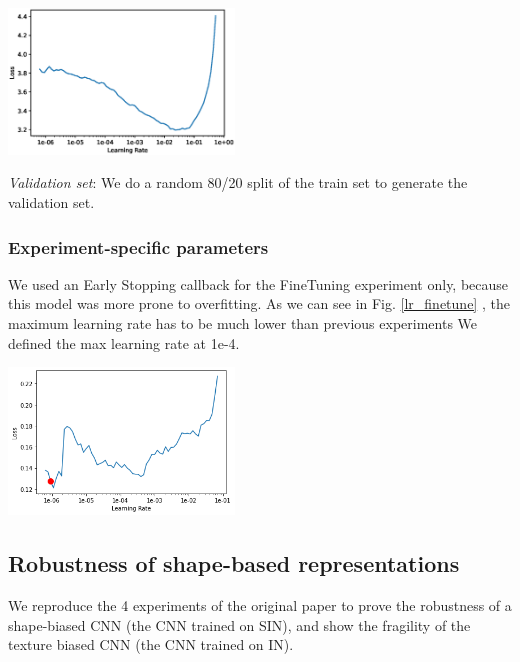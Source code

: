 \documentclass{article}
\begin{document}
\begin{center}
  \captionsetup{type=figure}
  \includegraphics[width = 0.45\textwidth]{imgs/lr_find.eps}
  \label{lr_finder}
\end{center}

\textit{Validation set}: We do a random 80/20 split of the train set to generate the 
validation set.

\subsubsection{Experiment-specific parameters}
We used an Early Stopping callback for the FineTuning experiment only, because this model was more prone to overfitting.
As we can see in Fig. \ref{lr_finetune} , the maximum learning rate has to be much lower than previous experiments 
We defined the max learning rate at 1e-4.

\begin{center}
  \captionsetup{type=figure}
  \includegraphics[width = 0.45\textwidth]{imgs/lr_finetune.png}
  \label{lr_finetune}
\end{center}


\subsection{Robustness of shape-based representations}

We reproduce the 4 experiments of the original paper to prove the robustness of a shape-biased CNN
(the CNN trained on SIN),
and show the fragility of the texture biased CNN (the CNN trained on IN). 
\end{document}
